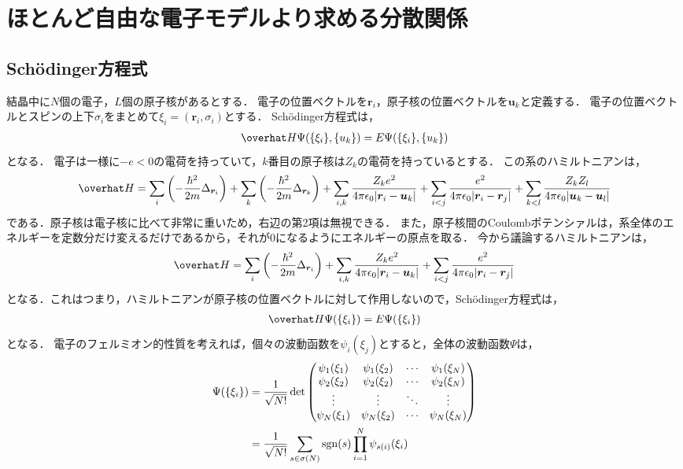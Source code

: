 \documentclass{report}
\begin{document}
  \chapter{ほとんど自由な電子モデルより求める分散関係}
    \section{Sch\"odinger方程式}
      結晶中に$N$個の電子，$L$個の原子核があるとする．
      電子の位置ベクトルを$\bm{r}_i$，原子核の位置ベクトルを$\bm{u}_k$と定義する．
      電子の位置ベクトルとスピンの上下$\sigma_i$をまとめて$\xi_i = (\bm{r}_i, \sigma_i)$とする．
      Sch\"odinger方程式は，
      \begin{align}
        \hat{H}\Psi\qty(\qty{\xi_i}, \qty{u_k}) = E\Psi\qty(\qty{\xi_i}, \qty{u_k})
      \end{align}
      となる．
      電子は一様に$-e < 0$の電荷を持っていて，$k$番目の原子核は$Z_k$の電荷を持っているとする．
      この系のハミルトニアンは，
      \begin{align}
        \hat{H} = \sum_{i}\qty(-\frac{\hbar^2}{2m}\laplacian_{\bm{r}_i})
        + \sum_{k}\qty(-\frac{\hbar^2}{2m}\laplacian_{\bm{r}_k})
        + \sum_{i, k}\frac{Z_k e^2}{4\pi\epsilon_0\abs{\bm{r}_i - \bm{u}_k}} 
        + \sum_{i < j}\frac{e^2}{4\pi\epsilon_0\abs{\bm{r}_i - \bm{r}_j}}
        + \sum_{k < l}\frac{Z_kZ_l}{4\pi\epsilon_0\abs{\bm{u}_k - \bm{u}_l}}
      \end{align}
      である．原子核は電子核に比べて非常に重いため，右辺の第2項は無視できる．
      また，原子核間のCoulombポテンシァルは，系全体のエネルギーを定数分だけ変えるだけであるから，それが0になるようにエネルギーの原点を取る．
      今から議論するハミルトニアンは，
      \begin{align}
        \hat{H} = \sum_{i}\qty(-\frac{\hbar^2}{2m}\laplacian_{\bm{r}_i})
        + \sum_{i, k}\frac{Z_k e^2}{4\pi\epsilon_0\abs{\bm{r}_i - \bm{u}_k}}
        + \sum_{i < j}\frac{e^2}{4\pi\epsilon_0\abs{\bm{r}_i - \bm{r}_j}} \label{hamiltonian}
      \end{align}
      となる．これはつまり，ハミルトニアンが原子核の位置ベクトルに対して作用しないので，Sch\"odinger方程式は，
      \begin{align}
        \hat{H}\Psi\qty(\qty{\xi_i}) = E\Psi\qty(\qty{\xi_i})
      \end{align}
      となる．
      電子のフェルミオン的性質を考えれば，個々の波動函数を$\psi_i(\xi_j)$とすると，全体の波動函数$\Psi$は，
      \begin{align}
        \Psi\qty(\qty{\xi_i}) &= \frac{1}{\sqrt{N!}}\det
        \begin{pmatrix}
          \psi_1(\xi_1) & \psi_1(\xi_2) & \cdots & \psi_1(\xi_N) \\
          \psi_2(\xi_2) & \psi_2(\xi_2) & \cdots & \psi_2(\xi_N) \\
          \vdots & \vdots & \ddots & \vdots \\
          \psi_N(\xi_1) & \psi_N(\xi_2) & \cdots & \psi_N(\xi_N)
        \end{pmatrix}\\ 
        &= \frac{1}{\sqrt{N!}}\sum_{s\in\sigma(N)} \mathrm{sgn}(s) \prod_{i = 1}^{N}\psi_{s(i)}(\xi_i)
      \end{align}
\end{document}
